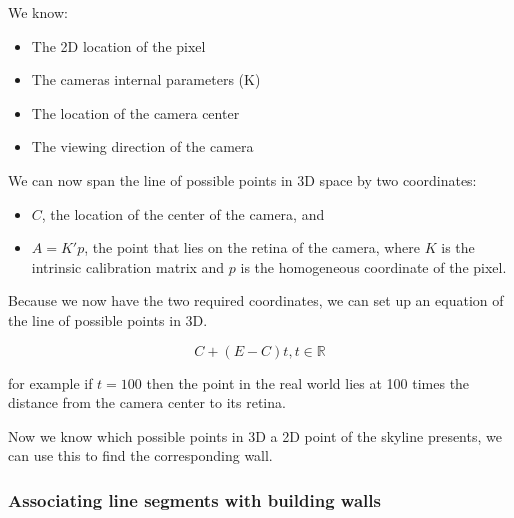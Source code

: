 	We know:
	\begin{itemize}
		\item The 2D location of the pixel
		\item The cameras internal parameters (K) 
		\item The location of the camera center
		\item The viewing direction of the camera
	\end{itemize}


	We can now span the line of possible points in 3D space by two coordinates:\\
	\begin{itemize}
		\item $C$, the location of the center of the camera, and
		\item $A = K'p$, the point that lies on the retina of the camera, where
		$K$ is the intrinsic calibration matrix and $p$ is the homogeneous
		coordinate of the pixel.
	\end{itemize}



	Because we now have the two required coordinates, we can set up an equation of the
	line of possible points in 3D.  

	\[ C + (E-C)t, t \in \mathbb{R} \]

	for example if $t=100$ then the point in the real world lies at 100 times the
		distance from the camera center to its retina.

	Now we know which possible points in 3D a 2D point of the skyline presents,
	we can use this to find the corresponding wall.


\subsubsection{Associating line segments with building walls}
